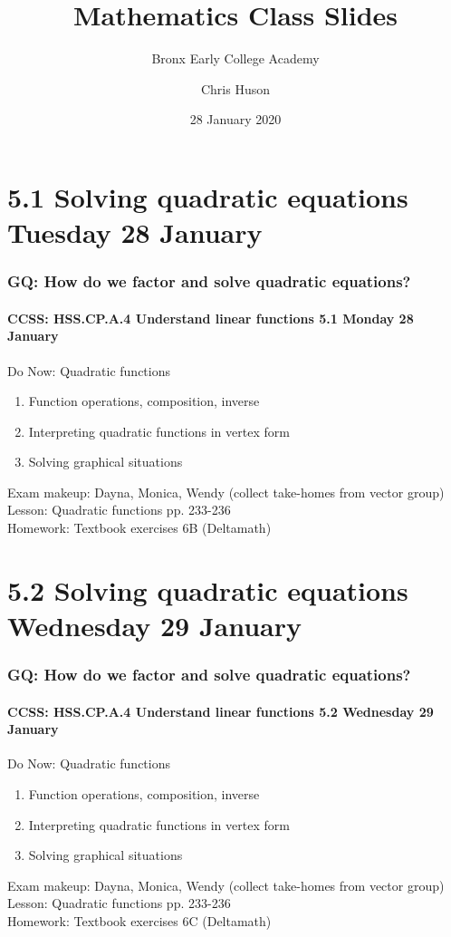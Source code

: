 \documentclass{beamer}
\title{Mathematics Class Slides}
\subtitle{Bronx Early College Academy}
\author{Chris Huson}
\date{28 January 2020}
\begin{document}
\frame{\titlepage}
\section[Outline]{}
\frame{\tableofcontents}

\section{5.1 Solving quadratic equations Tuesday 28 January}
\frame
{
  \frametitle{GQ: How do we factor and solve quadratic equations?}
  \framesubtitle{CCSS: HSS.CP.A.4 Understand linear functions \hfill \alert{5.1 Monday 28 January}}

  \begin{block}{Do Now: Quadratic functions}
    \begin{enumerate}
      \item Function operations, composition, inverse
      \item Interpreting quadratic functions in vertex form
      \item Solving graphical situations
    \end{enumerate}
    \end{block}
    Exam makeup: Dayna, Monica, Wendy (collect take-homes from vector group)
    Lesson: Quadratic functions pp. 233-236 \\ \smallskip
    Homework: Textbook exercises 6B (Deltamath)
    }

\section{5.2 Solving quadratic equations Wednesday 29 January}
\frame
{
  \frametitle{GQ: How do we factor and solve quadratic equations?}
  \framesubtitle{CCSS: HSS.CP.A.4 Understand linear functions \hfill \alert{5.2 Wednesday 29 January}}

  \begin{block}{Do Now: Quadratic functions}
    \begin{enumerate}
      \item Function operations, composition, inverse
      \item Interpreting quadratic functions in vertex form
      \item Solving graphical situations
    \end{enumerate}
    \end{block}
    Exam makeup: Dayna, Monica, Wendy (collect take-homes from vector group)
    Lesson: Quadratic functions pp. 233-236 \\ \smallskip
    Homework: Textbook exercises 6C (Deltamath)
    }
\end{document}
